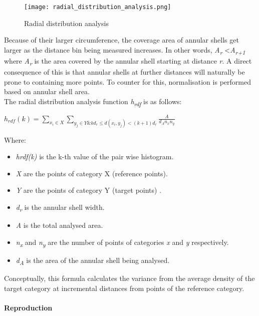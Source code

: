 \begin{figure}[h]
  \centering
	\label{Radial distribution analysis}
	\texttt{[image: radial\_distribution\_analysis.png]}
	\caption{Radial distribution analysis}
\end{figure}

Because of their larger circumference, the coverage area of annular shells get larger as the distance bin being measured increases. In other words, \textit{A\textsubscript{r}} \textless \textit{A\textsubscript{r+1}} where \textit{A\textsubscript{r}} is the area covered by the annular shell starting at distance \textit{r}. A direct consequence of this is that annular shells at further distances will naturally be prone to containing more points. To counter for this, normalisation is performed based on annular shell area. \\

The radial distribution analysis function \textit{h\textsubscript{rdf}} is as follows:\\
\begin{center}	
$h_{rdf}(k) = \sum_{x_{i} \in X} \sum_{y_{j} \in Y \&  
kd_{r} \leq d(x_{i}, y_{j}) < (k+1)d_{r} } \frac{A}{d_{A}n_{x}n_{y}} $
\end{center}
Where:
\begin{itemize}
\item \textit{hrdf(k)} is the k-th value of the pair wise histogram.
\item \textit{X} are the points of category X (reference points).
\item \textit{Y} are the points of category Y (target points)    .
\item \textit{d\textsubscript{r}} is the annular shell width.
\item \textit{A} is the total analysed area.
\item \textit{n\textsubscript{x}} and \textit{n\textsubscript{y}} are the number of points of categories \textit{x} and \textit{y} respectively.
\item \textit{d\textsubscript{A}} is the area of the annular shell being analysed.
\end{itemize}

Conceptually, this formula calculates the variance from the average density of the target category at incremental distances from points of the reference category.\\

\paragraph{Reproduction}

